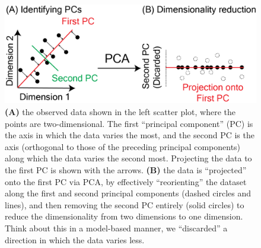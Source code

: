 \begin{figure}[h]
\includegraphics[width=\linewidth]{foundations/ch1/Images/pca_ex.png}
\caption[Principal components analysis]{\textbf{(A)} the observed data shown in the left scatter plot, where the points are two-dimensional. The first ``principal component'' (PC) is the axis in which the data varies the most, and the second PC is the axis (orthogonal to those of the preceding principal components) along which the data varies the second most. Projecting the data to the first PC is shown with the arrows. \textbf{(B)} the data is ``projected'' onto the first PC via PCA, by effectively ``reorienting'' the dataset along the first and second principal components (dashed circles and lines), and then removing the second PC entirely (solid circles) to reduce the dimensionality from two dimensions to one dimension. Think about this in a model-based manner, we ``discarded'' a direction in which the data varies less.}
\label{fig:ch1:pcaex}
\end{figure}

\newpage